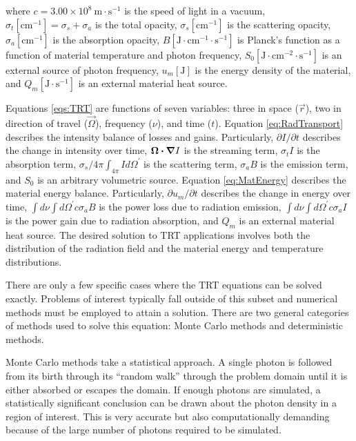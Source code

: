 \documentclass{article}
\begin{document}
\noindent where $c=3.00 \times 10^{8}\ \text{m} \cdot \text{s}^{-1}$ is the speed of light in a vacuum, $\sigma_t \left[\text{cm}^{-1} \right] = \sigma_s + \sigma_a$ is the total opacity, $\sigma_s \left[\text{cm}^{-1} \right]$ is the scattering opacity, $\sigma_a \left[\text{cm}^{-1} \right]$ is the absorption opacity, $B \left[\text{J} \cdot \text{cm}^{-1} \cdot \text{s}^{-1} \right]$ is Planck's function as a function of material temperature and photon frequency, $S_0 \left[\text{J} \cdot \text{cm}^{-2} \cdot \text{s}^{-1} \right]$ is an external source of photon frequency, $u_m \left[\text{J} \right]$ is the energy density of the material, and $Q_m \left[\text{J} \cdot \text{s}^{-1} \right]$ is an external material heat source.

Equations \ref{eqs:TRT} are functions of seven variables: three in space ($\vec{r}$), two in direction of travel ($\vec{\Omega}$), frequency ($\nu$), and time ($t$). Equation \ref{eq:RadTransport} describes the intensity balance of losses and gains. Particularly, $\partial I / \partial t$ describes the change in intensity over time, $\bm{\Omega} \bm{\cdot} \bm{\nabla} I$ is the streaming term, $\sigma_t I$ is the absorption term, $\sigma_s / 4 \pi \int_{4 \pi} I d \Omega^\prime$ is the scattering term, $\sigma_a B$ is the emission term, and $S_0$ is an arbitrary volumetric source. Equation \ref{eq:MatEnergy} describes the material energy balance. Particularly, $\partial u_m / \partial t$ describes the change in energy over time, $\int d \nu \int d \Omega^\prime c \sigma_a B$ is the power loss due to radiation emission, $\int d \nu \int d \Omega^\prime c \sigma_a I$ is the power gain due to radiation absorption, and $Q_m$ is an external material heat source. The desired solution to TRT applications involves both the distribution of the radiation field and the material energy and temperature distributions.

There are only a few specific cases where the TRT equations can be solved exactly. Problems of interest typically fall outside of this subset and numerical methods must be employed to attain a solution. There are two general categories of methods used to solve this equation: Monte Carlo methods and deterministic methods.

Monte Carlo methods take a statistical approach. A single photon is followed from its birth through its ``random walk'' through the problem domain until it is either absorbed or escapes the domain. If enough photons are simulated, a statistically significant conclusion can be drawn about the photon density in a region of interest. This is very accurate but also computationally demanding because of the large number of photons required to be simulated.
\end{document}
